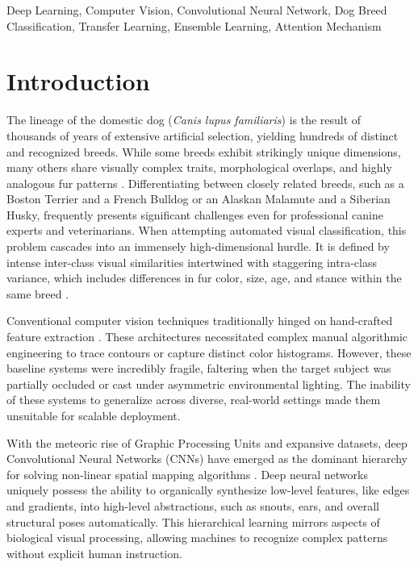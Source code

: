 \documentclass[conference]{IEEEtran}
\begin{document}
\begin{IEEEkeywords}
Deep Learning, Computer Vision, Convolutional Neural Network, Dog Breed Classification, Transfer Learning, Ensemble Learning, Attention Mechanism
\end{IEEEkeywords}

\section{Introduction}
The lineage of the domestic dog (\textit{Canis lupus familiaris}) is the result of thousands of years of extensive artificial selection, yielding hundreds of distinct and recognized breeds. While some breeds exhibit strikingly unique dimensions, many others share visually complex traits, morphological overlaps, and highly analogous fur patterns \cite{b2}. Differentiating between closely related breeds, such as a Boston Terrier and a French Bulldog or an Alaskan Malamute and a Siberian Husky, frequently presents significant challenges even for professional canine experts and veterinarians. When attempting automated visual classification, this problem cascades into an immensely high-dimensional hurdle. It is defined by intense inter-class visual similarities intertwined with staggering intra-class variance, which includes differences in fur color, size, age, and stance within the same breed \cite{b3}.

Conventional computer vision techniques traditionally hinged on hand-crafted feature extraction \cite{b1}. These architectures necessitated complex manual algorithmic engineering to trace contours or capture distinct color histograms. However, these baseline systems were incredibly fragile, faltering when the target subject was partially occluded or cast under asymmetric environmental lighting. The inability of these systems to generalize across diverse, real-world settings made them unsuitable for scalable deployment.

With the meteoric rise of Graphic Processing Units and expansive datasets, deep Convolutional Neural Networks (CNNs) have emerged as the dominant hierarchy for solving non-linear spatial mapping algorithms \cite{b8, b11}. Deep neural networks uniquely possess the ability to organically synthesize low-level features, like edges and gradients, into high-level abstractions, such as snouts, ears, and overall structural poses automatically. This hierarchical learning mirrors aspects of biological visual processing, allowing machines to recognize complex patterns without explicit human instruction.
\end{document}
